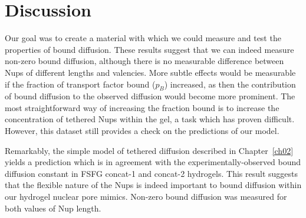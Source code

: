 



\section{Discussion}

Our goal was to create a material with which we could measure and test the properties of bound diffusion.  These results suggest that we can indeed measure non-zero bound diffusion, although there is no measurable difference between Nups of different lengths and valencies.  More subtle effects would be measurable if the fraction of transport factor bound ($p_B$) increased, as then the contribution of bound diffusion to the observed diffusion would become more prominent.  The most straightforward way of increasing the fraction bound is to increase the concentration of tethered Nups within the gel, a task which has proven difficult.  However, this dataset still provides a check on the predictions of our model.

Remarkably, the simple model of tethered diffusion described in Chapter~\ref{ch02} yields a prediction which is in agreement with the experimentally-observed bound diffusion constant in FSFG concat-1 and concat-2 hydrogels.  This result suggests that the flexible nature of the Nups is indeed important to bound diffusion within our hydrogel nuclear pore mimics.  Non-zero bound diffusion was measured for both values of Nup length.  %

